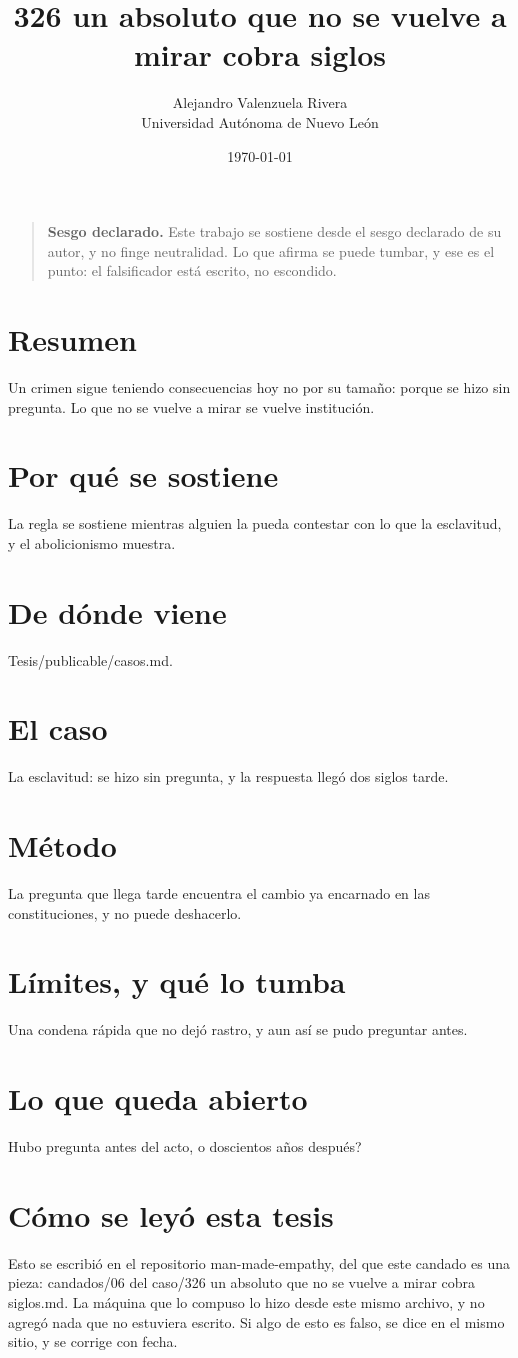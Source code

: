 \documentclass[11pt,a4paper]{article}
\title{326 un absoluto que no se vuelve a mirar cobra siglos}
\author{Alejandro Valenzuela Rivera\\\small Universidad Autónoma de Nuevo León}
\date{\today}
\begin{document}
\maketitle

\begin{quote}
\textbf{Sesgo declarado.} Este trabajo se sostiene desde el sesgo declarado de su autor, y no finge neutralidad. Lo que afirma se puede tumbar, y ese es el punto: el falsificador está escrito, no escondido.
\end{quote}

\section*{Resumen}
Un crimen sigue teniendo consecuencias hoy no por su tamaño: porque se hizo sin pregunta. Lo que no se vuelve a mirar se vuelve institución.

\section{Por qué se sostiene}
La regla se sostiene mientras alguien la pueda contestar con lo que la esclavitud, y el abolicionismo muestra.

\section{De dónde viene}
Tesis/publicable/casos.md.

\section{El caso}
La esclavitud: se hizo sin pregunta, y la respuesta llegó dos siglos tarde.

\section{Método}
La pregunta que llega tarde encuentra el cambio ya encarnado en las constituciones, y no puede deshacerlo.

\section{Límites, y qué lo tumba}
Una condena rápida que no dejó rastro, y aun así se pudo preguntar antes.

\section{Lo que queda abierto}
\textquestiondown{}Hubo pregunta antes del acto, o doscientos años después?

\section*{Cómo se leyó esta tesis}
Esto se escribió en el repositorio man-made-empathy, del que este candado es una pieza: candados/06 del caso/326 un absoluto que no se vuelve a mirar cobra siglos.md. La máquina que lo compuso lo hizo desde este mismo archivo, y no agregó nada que no estuviera escrito. Si algo de esto es falso, se dice en el mismo sitio, y se corrige con fecha.
\end{document}
